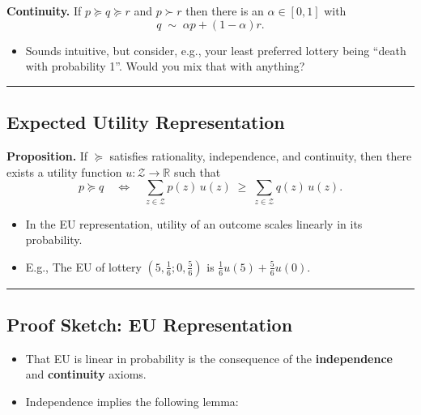 \documentclass[
  letterpaper,
  DIV=11,
  numbers=noendperiod]{scrartcl}
\providecommand{\tightlist}{%
  \setlength{\itemsep}{0pt}\setlength{\parskip}{0pt}}\usepackage{longtable,booktabs,array}
\begin{document}
\label{ax:continuity}
\textbf{Continuity.} If \(p\succeq q\succeq r\) and \(p\succ r\) then
there is an \(\alpha\in[0,1]\) with
\[q\;\sim\; \alpha p + (1-\alpha)r.\]

\begin{itemize}
\tightlist
\item
  Sounds intuitive, but consider, e.g., your least preferred lottery
  being ``death with probability 1''. Would you mix that with anything?
\end{itemize}

\begin{center}\rule{0.5\linewidth}{0.5pt}\end{center}

\subsection{Expected Utility
Representation}\label{expected-utility-representation}

\label{prop:EUT}
\textbf{Proposition.} If \(\succeq\) satisfies rationality,
independence, and continuity, then there exists a utility function
\(u:\mathcal{Z}\to\mathbb{R}\) such that \[
p\succeq q \quad\Longleftrightarrow\quad \sum_{z\in\mathcal{Z}} p(z)\,u(z)\;\ge\; \sum_{z\in\mathcal{Z}} q(z)\,u(z).
\]

\begin{itemize}
\tightlist
\item
  In the EU representation, utility of an outcome scales linearly in its
  probability.
\item
  E.g., The EU of lottery \((5, \frac{1}{6}; 0, \frac{5}{6})\) is
  \(\frac{1}{6} u(5) + \frac{5}{6} u(0).\)
\end{itemize}

\begin{center}\rule{0.5\linewidth}{0.5pt}\end{center}

\subsection{Proof Sketch: EU
Representation}\label{proof-sketch-eu-representation}

\begin{itemize}
\tightlist
\item
  That EU is linear in probability is the consequence of the
  \textbf{independence} and \textbf{continuity} axioms.
\item
  Independence implies the following lemma:
\end{itemize}
\end{document}
